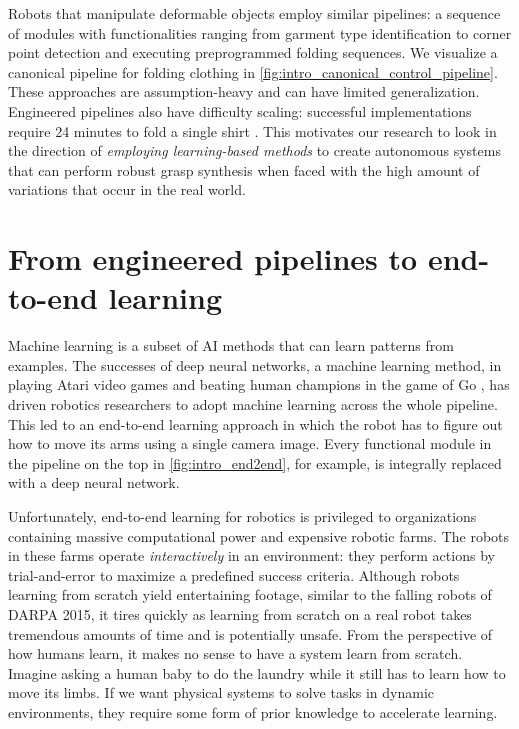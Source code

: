 \documentclass[\home/main.tex]{subfiles}
\begin{document}
Robots that manipulate deformable objects employ similar pipelines: a sequence of modules with functionalities ranging from garment type identification to corner point detection and executing preprogrammed folding sequences. We visualize a canonical pipeline for folding clothing in \cref{fig:intro_canonical_control_pipeline}. These approaches are assumption-heavy and can have limited generalization. Engineered pipelines also have difficulty scaling: successful implementations require 24 minutes to fold a single shirt \autocite{Maitin2010}. This motivates our research to look in the direction of \emph{employing learning-based methods} to create autonomous systems that can perform robust grasp synthesis when faced with the high amount of variations that occur in the real world.

\begin{sidewaysfigure}
    \centering
    
    \caption{Canonical robotic control pipeline for folding clothing. Each module solves an isolated task and passes the result to the next module.}
    \label{fig:intro_canonical_control_pipeline}
\end{sidewaysfigure}

\section{From engineered pipelines to end-to-end learning}
Machine learning is a subset of \gls{AI} methods that can learn patterns from examples. The successes of deep neural networks, a machine learning method, in playing Atari video games \autocite{Mnih2015} and beating human champions in the game of Go \autocite{gaemofGo2016}, has driven robotics researchers to adopt machine learning across the whole pipeline. This led to an end-to-end learning approach in which the robot has to figure out how to move its arms using a single camera image. Every functional module in the pipeline on the top in \cref{fig:intro_end2end}, for example, is integrally replaced with a deep neural network.

Unfortunately, end-to-end learning for robotics is privileged to organizations containing massive computational power and expensive robotic farms. The robots in these farms operate \emph{interactively} in an environment: they perform actions by trial-and-error to maximize a predefined success criteria. Although robots learning from scratch yield entertaining footage, similar to the falling robots of DARPA 2015, it tires quickly as learning from scratch on a real robot takes tremendous amounts of time and is potentially unsafe. From the perspective of how humans learn, it makes no sense to have a system learn from scratch. Imagine asking a human baby to do the laundry while it still has to learn how to move its limbs. If we want physical systems to solve tasks in dynamic environments, they require some form of prior knowledge to accelerate learning.
\end{document}
